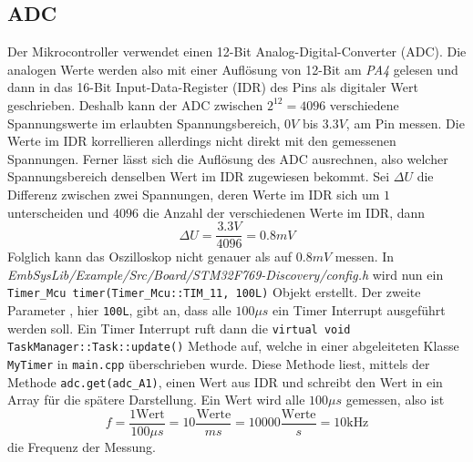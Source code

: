 \subsection{ADC}

Der Mikrocontroller verwendet einen 12-Bit Analog-Digital-Converter (ADC).
Die analogen Werte werden also mit einer Auflösung von 12-Bit am \textit{PA4} gelesen und dann
in das 16-Bit Input-Data-Register (IDR) des Pins als digitaler Wert
geschrieben\cite{MikroControllerDatasheet_1}.
Deshalb kann der ADC zwischen $2^{12} = 4096$ verschiedene Spannungswerte im erlaubten Spannungsbereich,
$0V$ bis $3.3V$, am Pin messen\cite{MikroControllerDatasheet_1}.
Die Werte im IDR korrellieren allerdings nicht direkt mit den gemessenen Spannungen.
Ferner lässt sich die Auflösung des ADC ausrechnen, also welcher Spannungsbereich denselben
Wert im IDR zugewiesen bekommt. \newline
Sei $\Delta U$ die Differenz zwischen zwei Spannungen, deren Werte im IDR sich um $1$
unterscheiden und $4096$ die Anzahl der verschiedenen Werte im IDR, \newline
dann
$$\Delta U = \frac{3.3V}{4096} = 0.8mV$$
Folglich kann das Oszilloskop nicht genauer als auf $0.8mV$ messen.
\newline \newline
In \textit{EmbSysLib/Example/Src/Board/STM32F769-Discovery/config.h} wird nun ein
\texttt{Timer\_Mcu timer(Timer\_Mcu::TIM\_11, 100L)} Objekt erstellt\cite{EmbSysLib}. \newline
Der zweite Parameter , hier \texttt{100L}, gibt an, dass alle $100\mu s$ ein Timer Interrupt ausgeführt werden soll.
Ein Timer Interrupt ruft dann die \texttt{virtual void TaskManager::Task::update()} Methode auf,
welche in einer abgeleiteten Klasse \texttt{MyTimer} in \texttt{main.cpp} überschrieben wurde.
Diese Methode liest, mittels der Methode \texttt{adc.get(adc\_A1)},
einen Wert aus IDR und schreibt den Wert in ein Array für die spätere Darstellung. \newline
Ein Wert wird alle $100\mu s$ gemessen, also ist
$$
f = \frac{1 \text{Wert}}{100 \mu s} = 10\frac{\text{Werte}}{ms} = 10000 \frac{\text{Werte}}{s}
  = 10 \si{\kilo\hertz}
$$
die Frequenz der Messung.


